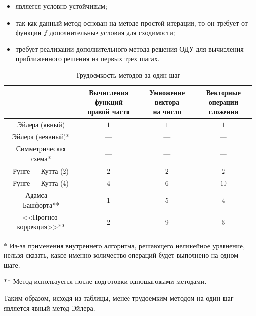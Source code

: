 \documentclass[12pt, a4paper]{article}
\begin{document}
\begin{enumerate}
		\begin{itemize}
			\item является условно устойчивым;
			\item так как данный метод основан на методе простой итерации, то он требует от функции $f$ дополнительные условия для сходимости;
			\item требует реализации дополнительного метода решения ОДУ для вычисления приближенного решения на первых трех шагах.
		\end{itemize}
		\begin{table}[H]
			\caption{Трудоемкость методов за один шаг}
			\footnotesize
			\begin{center}
				\begin{tabular}{|c|c|c|c|}
					\hline
					\makecell{Метод}&\makecell{Вычисления функций\\ правой части}&\makecell{Умножение вектора\\ на число}&\makecell{Векторные операции\\ сложения}\\
					\hline
					Эйлера (явный)&$1$&$1$&$1$\\
					\hline
					Эйлера (неявный)*&---&---&---\\
					\hline
					Симметрическая схема*&---&---&---\\
					\hline
					Рунге --- Кутта (2)&$2$&$2$&$2$\\
					\hline
					Рунге --- Кутта (4)&$4$&$6$&$10$\\
					\hline
					Адамса --- Башфорта**&1&5&4\\
					\hline
					<<Прогноз-коррекция>>**&2&9&8\\
					\hline
				\end{tabular}
			\end{center}
		\end{table}
		* Из-за применения внутреннего алгоритма, решающего нелинейное уравнение, нельзя сказать, какое именно количество операций будет выполнено на одном шаге.
		
		** Метод используется после подготовки одношаговыми методами.
		
		Таким образом, исходя из таблицы, менее трудоемким методом на один шаг является явный метод Эйлера.
		
		

\end{enumerate}
\end{document}
